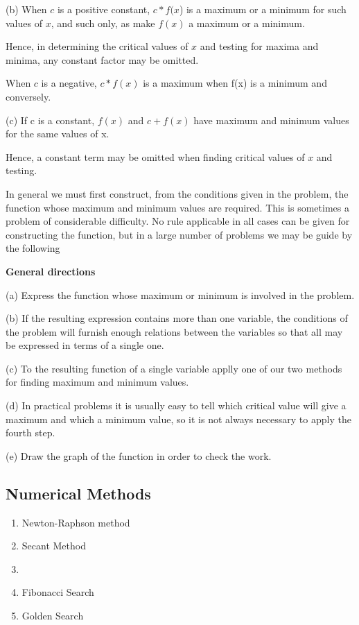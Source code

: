 \documentclass[12pt]{article}
\begin{document}
(b) When $c$ is a positive constant, $c*f(x$) is a maximum or a minimum for such values of $x$, and such only, as make $f(x)$ a maximum or a minimum.

Hence, in determining the critical values of $x$ and testing for maxima and minima, any constant factor may be omitted.

When $c$ is a negative, $c*f(x)$ is a maximum when f(x) is a minimum and conversely.

(c) If c is a constant, $f(x)$ and $c + f(x)$ have maximum and minimum values for the same values of x.

Hence, a constant term may be omitted when finding critical values of $x$ and testing.

In general we must first construct, from the conditions given in the problem, the function whose maximum and minimum values are required.  This is sometimes a problem of considerable difficulty.  No rule applicable in all cases can be given for constructing the function, but in a large number of problems we may be guide by the following

{\bf General directions}

(a)  Express the function whose maximum or minimum is involved in the problem.

(b)  If the resulting expression contains more than one variable, the conditions of the problem will furnish enough relations between the variables so that all may be expressed in terms of a single one.

(c)  To the resulting function of a single variable applly one of our two methods for finding maximum and minimum values.

(d)  In practical problems it is usually easy to tell which critical value will give a maximum and which a minimum value, so it is not always necessary to apply the fourth step.

(e)  Draw the graph of the function in order to check the work.


\subsection{Numerical Methods}

\begin{enumerate}
\item Newton-Raphson method
\item Secant Method
\item {}
\item Fibonacci Search
\item Golden  Search
\end{enumerate}
\end{document}
